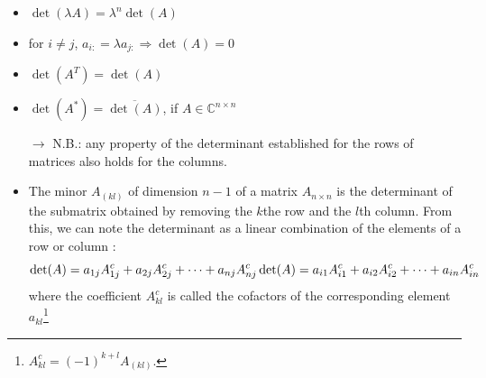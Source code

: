 \documentclass[12pt, openany]{report}
\theoremstyle{definition}
\begin{document}
\begin{itemize}
    \item \(\det (\lambda A)=\lambda^n \det(A)\)
    \item for \(i\neq j\), \(a_{i:} = \lambda a_{j:} \Longrightarrow \det(A) = 0\)
    \item \(\det(A^T) = \det(A)\)
    \item \(\det(A^*) = \overline{\det(A)}\), if \(A\in \mathbb{C}^{n\times n}\)
    \item [\(\rightarrow\)] N.B.: any property of the determinant established for the rows of matrices also holds for the columns.
    \item The minor \(A_{(kl)}\) of dimension \(n-1\) of a matrix \(A_{n\times 
 n}\) is the determinant of the submatrix obtained by removing the \(k\)the row and the \(l\)th column. From this, we can note the determinant as a linear combination of the elements of a row or column : \[\det(A) = a_{1j}A_{1j}^c + a_{2j}A_{2j}^c + \dots + a_{nj}A_{nj}^c \\ \det(A) = a_{i1}A_{i1}^c + a_{i2}A_{i2}^c + \dots + a_{in}A_{in}^c\] where the coefficient \(A_{kl}^c\) is called the cofactors of the corresponding element \(a_{kl}\)\footnote{\(A_{kl}^c = (-1)^{k+l}A_{(kl)}\).}
\end{itemize}
\end{document}
